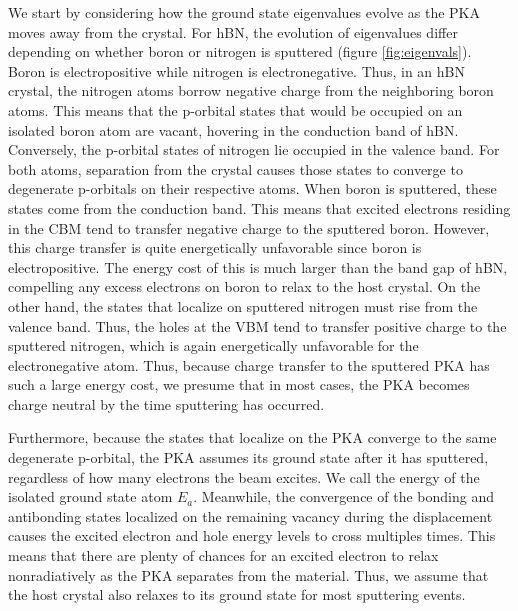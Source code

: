 \documentclass{article}
\begin{document}
We start by considering how the ground state eigenvalues evolve as the PKA
moves away from the crystal.  For hBN, the evolution of eigenvalues differ
depending on whether boron or nitrogen is sputtered (figure
\ref{fig:eigenvals}).  Boron is electropositive while nitrogen is
electronegative.  Thus, in an hBN crystal, the nitrogen atoms borrow negative
charge from the neighboring boron atoms.  This means that the p-orbital states
that would be occupied on an isolated boron atom are vacant, hovering in
the conduction band of hBN.  Conversely, the p-orbital states of nitrogen lie
occupied in the valence band.
For both atoms, separation from the crystal causes those states to converge to
degenerate p-orbitals on their respective atoms.
When boron is sputtered, these states come from the conduction band.
This means that excited electrons residing in the CBM tend to transfer
negative charge to the sputtered boron.  However, this charge transfer is quite
energetically unfavorable since boron is electropositive. The energy cost of
this is much larger than the band gap of hBN, compelling any excess electrons
on boron to relax to the host crystal. On the other hand, the states that
localize on sputtered nitrogen must rise from the valence band.
Thus, the holes at the VBM tend to transfer positive charge to the sputtered
nitrogen, which is again energetically unfavorable for the electronegative
atom.
Thus, because charge transfer to the sputtered PKA has such a large energy
cost, we presume that in most cases, the PKA becomes charge neutral by the time
sputtering has occurred.

Furthermore, because the states that localize on the PKA converge to the same
degenerate p-orbital, the PKA assumes its ground state after it has sputtered,
regardless of how many electrons the beam excites.
We call the energy of the isolated ground state atom $E_a$.
Meanwhile, the convergence of the bonding and antibonding states localized on
the remaining vacancy during the displacement causes the excited electron and
hole energy levels to cross multiples times.  This means that there are plenty
of chances for an excited electron to relax nonradiatively as the PKA separates
from the material.  Thus, we assume that the host crystal also relaxes to its
ground state for most sputtering events.
\end{document}
